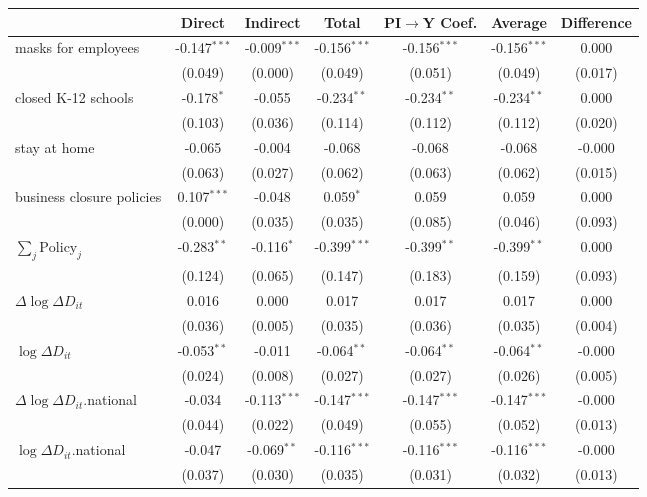 
\begin{tabular}{lccccc|>{}c}
\toprule
  & Direct & Indirect & Total & PI$\to$Y Coef. & Average & Difference\\
\midrule
masks for employees & -0.147$^{***}$ & -0.009$^{***}$ & -0.156$^{***}$ & -0.156$^{***}$ & -0.156$^{***}$ & 0.000\\
 & (0.049) & (0.000) & (0.049) & (0.051) & (0.049) & (0.017)\\
closed K-12 schools & -0.178$^{*}$ & -0.055 & -0.234$^{**}$ & -0.234$^{**}$ & -0.234$^{**}$ & 0.000\\
 & (0.103) & (0.036) & (0.114) & (0.112) & (0.112) & (0.020)\\
stay at home & -0.065 & -0.004 & -0.068 & -0.068 & -0.068 & -0.000\\
 & (0.063) & (0.027) & (0.062) & (0.063) & (0.062) & (0.015)\\
business closure policies & 0.107$^{***}$ & -0.048 & 0.059$^{*}$ & 0.059 & 0.059 & 0.000\\
 & (0.000) & (0.035) & (0.035) & (0.085) & (0.046) & (0.093)\\
$\sum_j \mathrm{Policy}_j$ & -0.283$^{**}$ & -0.116$^{*}$ & -0.399$^{***}$ & -0.399$^{**}$ & -0.399$^{**}$ & 0.000\\
 & (0.124) & (0.065) & (0.147) & (0.183) & (0.159) & (0.093)\\
$\Delta \log \Delta D_{it}$ & 0.016 & 0.000 & 0.017 & 0.017 & 0.017 & 0.000\\
 & (0.036) & (0.005) & (0.035) & (0.036) & (0.035) & (0.004)\\
$\log \Delta D_{it}$ & -0.053$^{**}$ & -0.011 & -0.064$^{**}$ & -0.064$^{**}$ & -0.064$^{**}$ & -0.000\\
 & (0.024) & (0.008) & (0.027) & (0.027) & (0.026) & (0.005)\\
$\Delta \log \Delta D_{it}$.national & -0.034 & -0.113$^{***}$ & -0.147$^{***}$ & -0.147$^{***}$ & -0.147$^{***}$ & -0.000\\
 & (0.044) & (0.022) & (0.049) & (0.055) & (0.052) & (0.013)\\
$\log \Delta D_{it}$.national & -0.047 & -0.069$^{**}$ & -0.116$^{***}$ & -0.116$^{***}$ & -0.116$^{***}$ & -0.000\\
 & (0.037) & (0.030) & (0.035) & (0.031) & (0.032) & (0.013)\\
\bottomrule
\end{tabular}